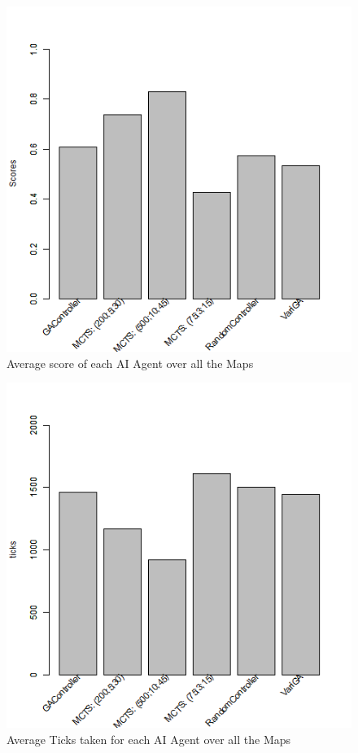 \documentclass{IEEEtran}
\begin{document}
\begin{figure}[ht]
\centering
\includegraphics[width=\linewidth]{scores-allmaps}
\caption{Average score of each AI Agent over all the Maps}
\label{avgScoreAllMaps}
\end{figure}

\begin{figure}[ht]
\centering
\includegraphics[width=\linewidth]{ticks-allmaps}
\caption{Average Ticks taken for each AI Agent over all the Maps}
\label{avgTicksAllMaps}
\end{figure}
\end{document}
